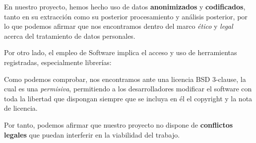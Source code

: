 En nuestro proyecto, hemos hecho uso de datos \textbf{anonimizados} y \textbf{codificados}, tanto en su extracción como su posterior procesamiento y análisis posterior, por lo que podemos afirmar que nos encontramos dentro del marco \textit{ético} y \textit{legal} acerca del tratamiento de datos personales.

Por otro lado, el empleo de Software implica el acceso y uso de herramientas registradas, especialmente librerías:


Como podemos comprobar, nos encontramos ante una licencia BSD 3-clause, la cual es una \textit{permisiva}, permitiendo a los desarrolladores modificar el software con toda la libertad que dispongan siempre que se incluya en él el copyright y la nota de licencia.

Por tanto, podemos afirmar que nuestro proyecto no dispone de \textbf{conflictos legales} que puedan interferir en la viabilidad del trabajo.